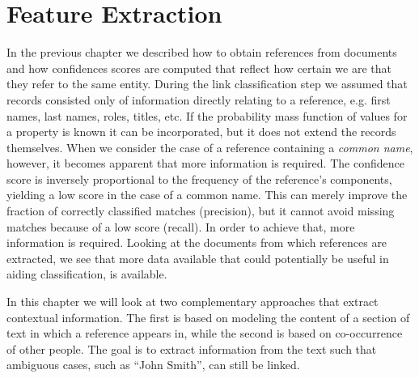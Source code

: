 \chapter{Feature Extraction}
\label{ch:feature_extraction}

In the previous chapter we described how to obtain references from documents and how confidences scores are computed that reflect how certain we are that they refer to the same entity.
During the link classification step we assumed that records consisted only of information directly relating to a reference, e.g. first names, last names, roles, titles, etc.
If the probability mass function of values for a property is known it can be incorporated, but it does not extend the records themselves.
When we consider the case of a reference containing a \emph{common name}, however, it becomes apparent that more information is required.
The confidence score is inversely proportional to the frequency of the reference's components, yielding a low score in the case of a common name.
This can merely improve the fraction of correctly classified matches (precision), but it cannot avoid missing matches because of a low score (recall).
In order to achieve that, more information is required.
Looking at the documents from which references are extracted, we see that more data available that could potentially be useful in aiding classification, is available.

In this chapter we will look at two complementary approaches that extract contextual information.
The first is based on modeling the content of a section of text in which a reference appears in, while the second is based on co-occurrence of other people.
The goal is to extract information from the text such that ambiguous cases, such as ``John Smith'', can still be linked.







